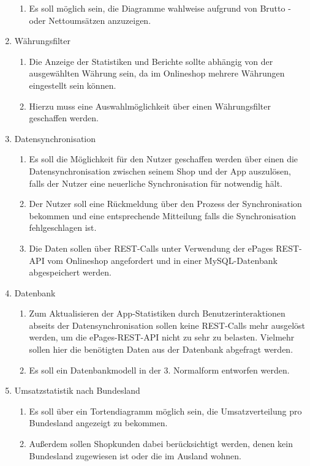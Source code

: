 \begin{enumerate}
\begin{enumerate}
\item Es soll möglich sein, die Diagramme wahlweise aufgrund von Brutto - oder Nettoumsätzen anzuzeigen.
\end{enumerate}
\item Währungsfilter
\begin{enumerate}
\item Die Anzeige der Statistiken und Berichte sollte abhängig von der  ausgewählten Währung sein, da im Onlineshop mehrere Währungen eingestellt sein können.
\item Hierzu muss eine Auswahlmöglichkeit über einen Währungsfilter geschaffen werden.
\end{enumerate}
\item Datensynchronisation
\begin{enumerate}
\item Es soll die Möglichkeit für den Nutzer geschaffen werden über einen  die Datensynchronisation zwischen seinem Shop und der App auszulösen, falls der Nutzer eine neuerliche Synchronisation für notwendig hält.
\item Der Nutzer soll eine Rückmeldung über den Prozess der Synchronisation bekommen und eine entsprechende Mitteilung falls die Synchronisation fehlgeschlagen ist.
\item Die Daten sollen über \acs{REST}-Calls unter Verwendung der ePages \acs{REST-API} vom Onlineshop angefordert und in einer \acs{MySQL}-Datenbank abgespeichert werden.
\end{enumerate}
\item Datenbank
\begin{enumerate}
\item Zum Aktualisieren der App-Statistiken durch Benutzerinteraktionen abseits der Datensynchronisation sollen keine \acs{REST}-Calls mehr ausgelöst werden, um die ePages-REST-API nicht zu sehr zu belasten. Vielmehr sollen hier die benötigten Daten aus der Datenbank abgefragt werden.
\item Es soll ein Datenbankmodell in der 3. Normalform entworfen werden.
\end{enumerate}
\item Umsatzstatistik nach Bundesland
\begin{enumerate}
\item Es soll über ein Tortendiagramm möglich sein, die Umsatzverteilung pro Bundesland angezeigt zu bekommen.
\item Außerdem sollen Shopkunden dabei berücksichtigt werden, denen kein Bundesland zugewiesen ist oder die im Ausland wohnen.

\end{enumerate}
\end{enumerate}
